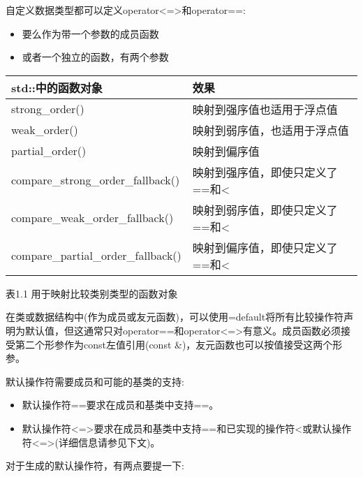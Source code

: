 

自定义数据类型都可以定义operator<=>和operator==:

\begin{itemize}
\item
要么作为带一个参数的成员函数

\item
或者一个独立的函数，有两个参数
\end{itemize}


\begin{longtable}[c]{|l|l|}
\hline
\textbf{std::中的函数对象} & \textbf{效果}                                             \\ \hline
\endfirsthead
%
\endhead
%
strong\_order()                   & 映射到强序值也适用于浮点值 \\ \hline
weak\_order()                     & 映射到弱序值，也适用于浮点值   \\ \hline
partial\_order()                  & 映射到偏序值                               \\ \hline
compare\_strong\_order\_fallback()  & 映射到强序值，即使只定义了==和<  \\ \hline
compare\_weak\_order\_fallback()    & 映射到弱序值，即使只定义了==和<    \\ \hline
compare\_partial\_order\_fallback() & 映射到偏序值，即使只定义了==和< \\ \hline
\end{longtable}

\begin{center}
表1.1 用于映射比较类别类型的函数对象
\end{center}



在类或数据结构中(作为成员或友元函数)，可以使用=default将所有比较操作符声明为默认值，但这通常只对operator==和operator<=>有意义。成员函数必须接受第二个形参作为const左值引用(const \&)，友元函数也可以按值接受这两个形参。

默认操作符需要成员和可能的基类的支持:

\begin{itemize}
\item
默认操作符==要求在成员和基类中支持==。

\item
默认操作符<=>要求在成员和基类中支持==和已实现的操作符<或默认操作符<=>(详细信息请参见下文)。
\end{itemize}

对于生成的默认操作符，有两点要提一下:

